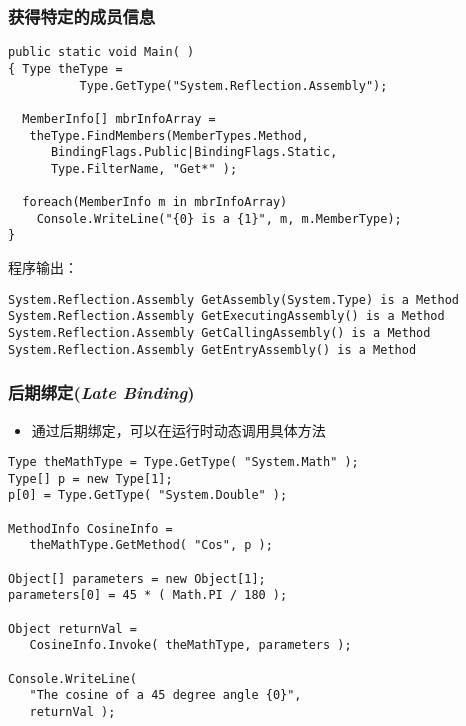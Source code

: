 \begin{frame}[fragile]
\frametitle{获得特定的成员信息}
\begin{lstlisting}
public static void Main( )
{ Type theType = 
          Type.GetType("System.Reflection.Assembly");
  
  MemberInfo[] mbrInfoArray =
   theType.FindMembers(MemberTypes.Method,
      BindingFlags.Public|BindingFlags.Static,
      Type.FilterName, "Get*" );

  foreach(MemberInfo m in mbrInfoArray)
    Console.WriteLine("{0} is a {1}", m, m.MemberType);
}
\end{lstlisting}
程序输出：\scriptsize
\begin{verbatim}
System.Reflection.Assembly GetAssembly(System.Type) is a Method
System.Reflection.Assembly GetExecutingAssembly() is a Method
System.Reflection.Assembly GetCallingAssembly() is a Method
System.Reflection.Assembly GetEntryAssembly() is a Method
\end{verbatim}
\end{frame}


\begin{frame}[fragile]
\frametitle{后期绑定(\textit{Late Binding})}
\begin{itemize}
\item 通过后期绑定，可以在运行时动态调用具体方法
\end{itemize}
\begin{lstlisting}
Type theMathType = Type.GetType( "System.Math" );
Type[] p = new Type[1];
p[0] = Type.GetType( "System.Double" );

MethodInfo CosineInfo =
   theMathType.GetMethod( "Cos", p );

Object[] parameters = new Object[1];
parameters[0] = 45 * ( Math.PI / 180 );

Object returnVal =
   CosineInfo.Invoke( theMathType, parameters );

Console.WriteLine(
   "The cosine of a 45 degree angle {0}",
   returnVal );
\end{lstlisting}
\end{frame}

